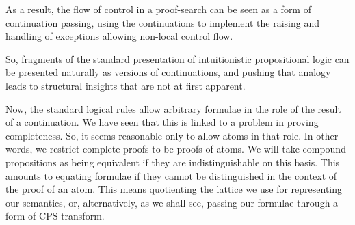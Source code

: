 \documentclass{sn-jnl}
\newcommand{\note}[1]{\textcolor{red} {[DP-Note: {#1}]}}
\begin{document}
As a result, the flow of control in a proof-search can be seen as a form of continuation passing, using the continuations to implement the raising and handling of exceptions allowing non-local control flow. 






   



So, fragments of the standard presentation of intuitionistic propositional logic can be presented naturally as versions of continuations, and pushing that analogy leads to structural insights that are not at first apparent. 

Now, the standard logical rules allow arbitrary formulae in the role of the result of a continuation. We have seen that this is linked to a problem in proving completeness. So, it seems reasonable only to allow atoms in that role. In other words, we restrict complete proofs to be proofs of atoms. We will take compound propositions as being equivalent if they are indistinguishable on this basis. This amounts to equating formulae if they cannot be distinguished in the context of the proof of an atom. This means quotienting the lattice we use for representing our semantics, or, alternatively, as we shall see, passing our formulae through a form of CPS-transform. 



\end{document}
